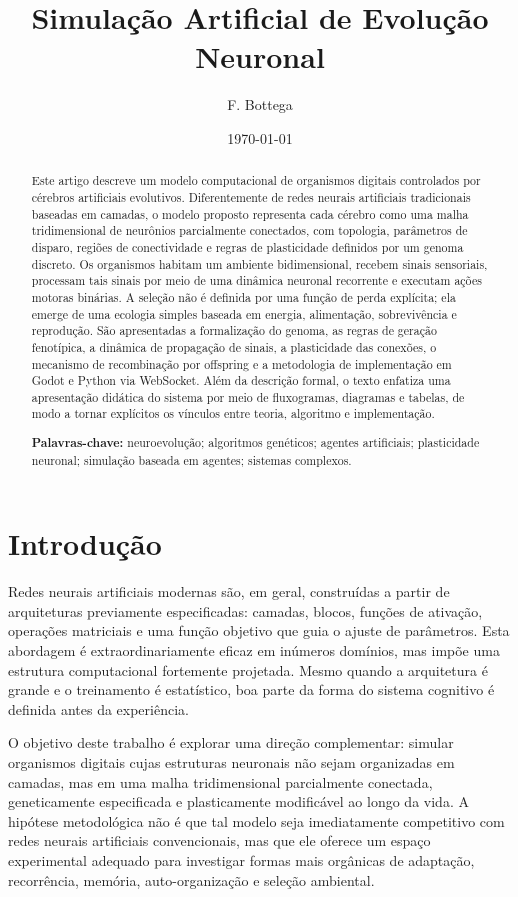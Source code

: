 \documentclass[12pt,a4paper,fleqn]{article}
\title{\textbf{Simulação Artificial de Evolução Neuronal}}
\author{F. Bottega}
\date{\today}
\newcounter{algoritmo}
\begin{document}
\maketitle

\begin{abstract}
\noindent Este artigo descreve um modelo computacional de organismos digitais controlados por cérebros artificiais evolutivos. Diferentemente de redes neurais artificiais tradicionais baseadas em camadas, o modelo proposto representa cada cérebro como uma malha tridimensional de neurônios parcialmente conectados, com topologia, parâmetros de disparo, regiões de conectividade e regras de plasticidade definidos por um genoma discreto. Os organismos habitam um ambiente bidimensional, recebem sinais sensoriais, processam tais sinais por meio de uma dinâmica neuronal recorrente e executam ações motoras binárias. A seleção não é definida por uma função de perda explícita; ela emerge de uma ecologia simples baseada em energia, alimentação, sobrevivência e reprodução. São apresentadas a formalização do genoma, as regras de geração fenotípica, a dinâmica de propagação de sinais, a plasticidade das conexões, o mecanismo de recombinação por offspring e a metodologia de implementação em Godot e Python via WebSocket. Além da descrição formal, o texto enfatiza uma apresentação didática do sistema por meio de fluxogramas, diagramas e tabelas, de modo a tornar explícitos os vínculos entre teoria, algoritmo e implementação.

\medskip
\noindent \textbf{Palavras-chave:} neuroevolução; algoritmos genéticos; agentes artificiais; plasticidade neuronal; simulação baseada em agentes; sistemas complexos.
\end{abstract}

\section{Introdução}

Redes neurais artificiais modernas são, em geral, construídas a partir de arquiteturas previamente especificadas: camadas, blocos, funções de ativação, operações matriciais e uma função objetivo que guia o ajuste de parâmetros. Esta abordagem é extraordinariamente eficaz em inúmeros domínios, mas impõe uma estrutura computacional fortemente projetada. Mesmo quando a arquitetura é grande e o treinamento é estatístico, boa parte da forma do sistema cognitivo é definida antes da experiência.

O objetivo deste trabalho é explorar uma direção complementar: simular organismos digitais cujas estruturas neuronais não sejam organizadas em camadas, mas em uma malha tridimensional parcialmente conectada, geneticamente especificada e plasticamente modificável ao longo da vida. A hipótese metodológica não é que tal modelo seja imediatamente competitivo com redes neurais artificiais convencionais, mas que ele oferece um espaço experimental adequado para investigar formas mais orgânicas de adaptação, recorrência, memória, auto-organização e seleção ambiental.
\end{document}
